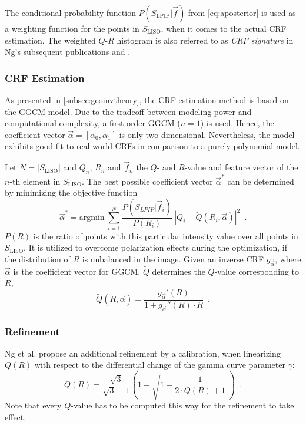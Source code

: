 The conditional probability function $P(S_\text{LPIP}| \vec{f})$ from \autoref{eq:aposterior} is used as a weighting function for the points in $S_\text{LISO}$, when it comes to the actual CRF estimation. The weighted \hbox{$Q$-$R$} histogram is also referred to as \emph{CRF signature} in Ng's subsequent publications \cite{ng_wifs09_1} and \cite{ng_wifs09_2}.


\clearpage

\subsubsection{CRF Estimation}
\label{subsubsec:CRFestimation}
As presented in \autoref{subsec:geoinvtheory}, the CRF estimation method is based on the GGCM model. Due to the tradeoff between modeling power and computational complexity, a first order GGCM \hbox{($n = 1$)} is used. Hence, the coefficient vector $\vec{\alpha} = \left[\alpha_0, \alpha_1\right]$ is only two-dimensional. Nevertheless, the model exhibits good fit to real-world CRFs in comparison to a purely polynomial model. 

Let $N = |S_\text{LISO}|$ and $Q_n$, $R_n$ and $\vec{f}_n$ the $Q$- and $R$-value and feature vector of the $n$-th element in $S_\text{LISO}$. The best possible coefficient vector $\vec{\alpha}^*$ can be determined by minimizing the objective function
\begin{equation}
	\vec{\alpha}^* = \mathrm{argmin} \ \sum\limits_{i = 1}^{N}{ \frac{P(S_{LPIP}| \vec{f}_i)}{P(R_i)} \ \left|Q_i - \widetilde{Q}(R_i,\vec{\alpha})\right|^2 } \enspace .
	\label{eq:objectivefunction}
\end{equation}
$P(R)$ is the ratio of points with this particular intensity value over all points in $S_\text{LISO}$. It is utilized to overcome polarization effects during the optimization, if the distribution of $R$ is unbalanced in the image. Given an inverse CRF $g_{\vec{\alpha}}$, where $\vec{\alpha}$ is the coefficient vector for GGCM, $\widetilde{Q}$ determines the $Q$-value corresponding to $R$,
\begin{equation}
	\widetilde{Q}(R, \vec{\alpha}) = \frac{g_{\vec{\alpha}}'(R)}{1 + g_{\vec{\alpha}}''(R) \cdot R} \enspace .
	\label{eq:Qtilde}
\end{equation}

\vspace{1cm}

\subsubsection{Refinement}
\label{subsubsec:refinement}

Ng et \hbox{al.} propose an additional refinement by a calibration, when linearizing $Q(R)$ with respect to the differential change of the gamma curve parameter $\gamma$:
\begin{equation}
	\overline{Q}(R) = \frac{\sqrt{3}}{\sqrt{3} - 1} \left(1 - \sqrt{1 - \frac{1}{2 \cdot Q(R)+1}}\ \right) \enspace .
	\label{eq:calibration}
\end{equation}
Note that every $Q$-value has to be computed this way for the refinement to take effect. 
